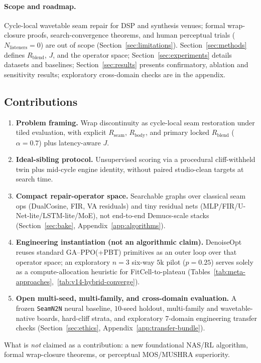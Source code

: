 \paragraph{Scope and roadmap.}
Cycle-local wavetable seam repair for DSP and synthesis venues; formal wrap-closure proofs, search-convergence theorems, and human perceptual trials ($N_{\mathrm{listeners}}{=}0$) are out of scope (Section~\ref{sec:limitations}).
Section~\ref{sec:methods} defines $R_{\mathrm{blend}}$, $J$, and the operator space; Section~\ref{sec:experiments} details datasets and baselines; Section~\ref{sec:results} presents confirmatory, ablation and sensitivity results; exploratory cross-domain checks are in the appendix.

\subsection{Contributions}
\label{sec:contributions}
\begin{enumerate}
  \item \textbf{Problem framing.} Wrap discontinuity as cycle-local seam restoration under tiled evaluation, with explicit $R_{\mathrm{seam}}$, $R_{\mathrm{body}}$, and primary locked $R_{\mathrm{blend}}$ ($\alpha{=}0.7$) plus latency-aware $J$.
  \item \textbf{Ideal-sibling protocol.} Unsupervised scoring via a procedural cliff-withheld twin plus mid-cycle engine identity, without paired studio-clean targets at search time.
  \item \textbf{Compact repair-operator space.} Searchable graphs over classical seam ops (DualCosine, FIR, VA residuals) and tiny residual nets (MLP/FIR/U-Net-lite/LSTM-lite/MoE), not end-to-end Demucs-scale stacks (Section~\ref{sec:bake}, Appendix~\ref{app:algorithms}).
  \item \textbf{Engineering instantiation (not an algorithmic claim).} DenoiseOpt reuses standard GA--PPO(+PBT) primitives as an outer loop over that operator space; an exploratory $n{=}3$ six-way $5$k pilot ($p{=}0.25$) serves solely as a compute-allocation heuristic for FitCell-to-plateau (Tables~\ref{tab:meta-approaches},~\ref{tab:v14-hybrid-converge}).
  \item \textbf{Open multi-seed, multi-family, and cross-domain evaluation.} A frozen \texttt{SeamN2N} neural baseline, $10$-seed holdout, multi-family and wavetable-native boards, hard-cliff strata, and exploratory 7-domain engineering transfer checks (Section~\ref{sec:ethics}, Appendix~\ref{app:transfer-bundle}).
\end{enumerate}
What is \emph{not} claimed as a contribution: a new foundational NAS/RL algorithm, formal wrap-closure theorems, or perceptual MOS/MUSHRA superiority.
